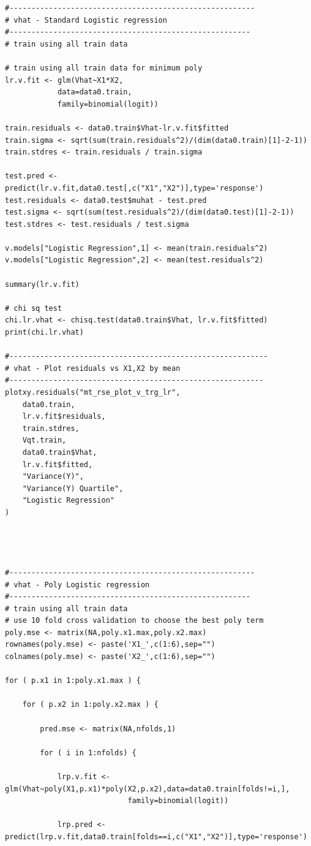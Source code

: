 \documentclass[twoside,12pt]{article}
\begin{document}
\begin{verbatim}
#--------------------------------------------------------
# vhat - Standard Logistic regression
#-------------------------------------------------------
# train using all train data

# train using all train data for minimum poly
lr.v.fit <- glm(Vhat~X1*X2,
			data=data0.train,
			family=binomial(logit))

train.residuals <- data0.train$Vhat-lr.v.fit$fitted
train.sigma <- sqrt(sum(train.residuals^2)/(dim(data0.train)[1]-2-1))
train.stdres <- train.residuals / train.sigma

test.pred <- predict(lr.v.fit,data0.test[,c("X1","X2")],type='response')
test.residuals <- data0.test$muhat - test.pred
test.sigma <- sqrt(sum(test.residuals^2)/(dim(data0.test)[1]-2-1))
test.stdres <- test.residuals / test.sigma

v.models["Logistic Regression",1] <- mean(train.residuals^2)
v.models["Logistic Regression",2] <- mean(test.residuals^2)

summary(lr.v.fit)

# chi sq test
chi.lr.vhat <- chisq.test(data0.train$Vhat, lr.v.fit$fitted)
print(chi.lr.vhat)

#-----------------------------------------------------------
# vhat - Plot residuals vs X1,X2 by mean
#----------------------------------------------------------
plotxy.residuals("mt_rse_plot_v_trg_lr",
	data0.train,
	lr.v.fit$residuals,
	train.stdres,
	Vqt.train,
	data0.train$Vhat,
	lr.v.fit$fitted,
	"Variance(Y)",
	"Variance(Y) Quartile",
	"Logistic Regression"
)




#--------------------------------------------------------
# vhat - Poly Logistic regression
#-------------------------------------------------------
# train using all train data
# use 10 fold cross validation to choose the best poly term
poly.mse <- matrix(NA,poly.x1.max,poly.x2.max)
rownames(poly.mse) <- paste('X1_',c(1:6),sep="")
colnames(poly.mse) <- paste('X2_',c(1:6),sep="")

for ( p.x1 in 1:poly.x1.max ) {

	for ( p.x2 in 1:poly.x2.max ) {

		pred.mse <- matrix(NA,nfolds,1)

		for ( i in 1:nfolds) {
	
			lrp.v.fit <- glm(Vhat~poly(X1,p.x1)*poly(X2,p.x2),data=data0.train[folds!=i,],
							family=binomial(logit))

			lrp.pred <- predict(lrp.v.fit,data0.train[folds==i,c("X1","X2")],type='response')


\end{verbatim}
\end{document}
